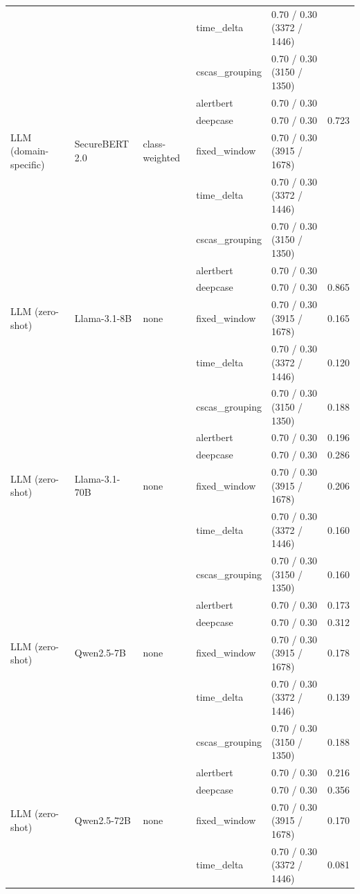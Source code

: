 \begin{table}[htbp]
{\begin{tabular}{lllllc}
 &  &  & time\_delta & 0.70 / 0.30 (3372 / 1446) &  \\
 &  &  & cscas\_grouping & 0.70 / 0.30 (3150 / 1350) &  \\
 &  &  & alertbert & 0.70 / 0.30 &  \\
 &  &  & deepcase & 0.70 / 0.30 & 0.723 \\
\addlinespace
LLM (domain-specific) & SecureBERT 2.0 & class-weighted & fixed\_window & 0.70 / 0.30 (3915 / 1678) &  \\
 &  &  & time\_delta & 0.70 / 0.30 (3372 / 1446) &  \\
 &  &  & cscas\_grouping & 0.70 / 0.30 (3150 / 1350) &  \\
 &  &  & alertbert & 0.70 / 0.30 &  \\
 &  &  & deepcase & 0.70 / 0.30 & 0.865 \\
\addlinespace
LLM (zero-shot) & Llama-3.1-8B & none & fixed\_window & 0.70 / 0.30 (3915 / 1678) & 0.165 \\
 &  &  & time\_delta & 0.70 / 0.30 (3372 / 1446) & 0.120 \\
 &  &  & cscas\_grouping & 0.70 / 0.30 (3150 / 1350) & 0.188 \\
 &  &  & alertbert & 0.70 / 0.30 & 0.196 \\
 &  &  & deepcase & 0.70 / 0.30 & 0.286 \\
\addlinespace
LLM (zero-shot) & Llama-3.1-70B & none & fixed\_window & 0.70 / 0.30 (3915 / 1678) & 0.206 \\
 &  &  & time\_delta & 0.70 / 0.30 (3372 / 1446) & 0.160 \\
 &  &  & cscas\_grouping & 0.70 / 0.30 (3150 / 1350) & 0.160 \\
 &  &  & alertbert & 0.70 / 0.30 & 0.173 \\
 &  &  & deepcase & 0.70 / 0.30 & 0.312 \\
\addlinespace
LLM (zero-shot) & Qwen2.5-7B & none & fixed\_window & 0.70 / 0.30 (3915 / 1678) & 0.178 \\
 &  &  & time\_delta & 0.70 / 0.30 (3372 / 1446) & 0.139 \\
 &  &  & cscas\_grouping & 0.70 / 0.30 (3150 / 1350) & 0.188 \\
 &  &  & alertbert & 0.70 / 0.30 & 0.216 \\
 &  &  & deepcase & 0.70 / 0.30 & 0.356 \\
\addlinespace
LLM (zero-shot) & Qwen2.5-72B & none & fixed\_window & 0.70 / 0.30 (3915 / 1678) & 0.170 \\
 &  &  & time\_delta & 0.70 / 0.30 (3372 / 1446) & 0.081 \\

\end{tabular}}
\end{table}
